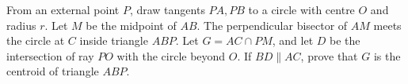 From an external point $ P $, draw tangents $ PA,PB $ to a circle with centre $ O $ and radius $ r $. Let $ M $ be the midpoint of $ AB $. The perpendicular bisector of $ AM $ meets the circle at $ C $ inside triangle $ ABP $. Let $ G=AC\cap PM $, and let $ D $ be the intersection of ray $ PO $ with the circle beyond $ O $. If $ BD\parallel AC $, prove that $ G $ is the centroid of triangle $ ABP $.
